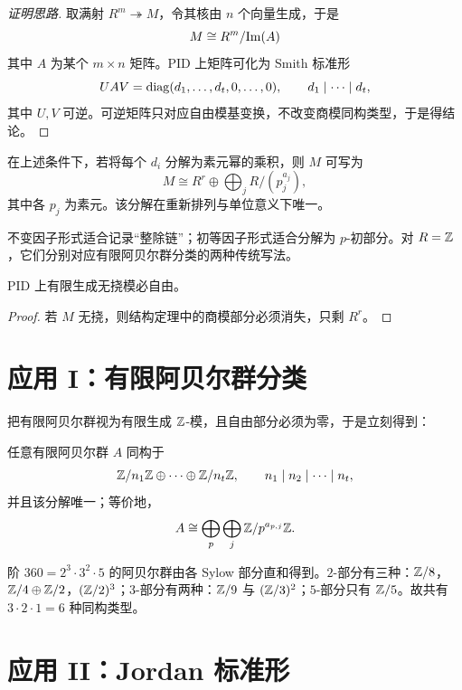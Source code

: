 \begin{proof}[证明思路]
取满射 $R^m\twoheadrightarrow M$，令其核由 $n$ 个向量生成，于是
\[
 M\cong R^m/\mathrm{Im}(A)
\]
其中 $A$ 为某个 $m\times n$ 矩阵。PID 上矩阵可化为 Smith 标准形
\[
 UAV=\mathrm{diag}(d_1,\dots,d_t,0,\dots,0),\qquad d_1\mid\cdots\mid d_t,
\]
其中 $U,V$ 可逆。可逆矩阵只对应自由模基变换，不改变商模同构类型，于是得结论。
\end{proof}

\begin{theorem}[初等因子形式]
在上述条件下，若将每个 $d_i$ 分解为素元幂的乘积，则 $M$ 可写为
\[
 M\cong R^r\oplus \bigoplus_{j} R/(p_j^{a_j}),
\]
其中各 $p_j$ 为素元。该分解在重新排列与单位意义下唯一。
\end{theorem}

\begin{remark}
不变因子形式适合记录“整除链”；初等因子形式适合分解为 $p$-初部分。对 $R=\mathbb{Z}$，它们分别对应有限阿贝尔群分类的两种传统写法。
\end{remark}

\begin{corollary}
PID 上有限生成无挠模必自由。
\end{corollary}

\begin{proof}
若 $M$ 无挠，则结构定理中的商模部分必须消失，只剩 $R^r$。
\end{proof}

\section{应用 I：有限阿贝尔群分类}

把有限阿贝尔群视为有限生成 $\mathbb{Z}$-模，且自由部分必须为零，于是立刻得到：

\begin{theorem}[有限阿贝尔群分类]
任意有限阿贝尔群 $A$ 同构于
\[
 \mathbb{Z}/n_1\mathbb{Z}\oplus \cdots \oplus \mathbb{Z}/n_t\mathbb{Z},
\qquad n_1\mid n_2\mid\cdots\mid n_t,
\]
并且该分解唯一；等价地，
\[
 A\cong \bigoplus_{p}\bigoplus_j \mathbb{Z}/p^{a_{p,j}}\mathbb{Z}.
\]
\end{theorem}

\begin{example}
阶 $360=2^3\cdot 3^2\cdot 5$ 的阿贝尔群由各 Sylow 部分直和得到。$2$-部分有三种：$\mathbb{Z}/8$，$\mathbb{Z}/4\oplus \mathbb{Z}/2$，$(\mathbb{Z}/2)^3$；$3$-部分有两种：$\mathbb{Z}/9$ 与 $(\mathbb{Z}/3)^2$；$5$-部分只有 $\mathbb{Z}/5$。故共有 $3\cdot2\cdot1=6$ 种同构类型。
\end{example}

\section{应用 II：Jordan 标准形}

